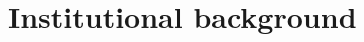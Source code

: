 \documentclass[../main.tex]{subfiles}
\begin{document}
\section{Institutional background}
\label{sec:institutional_background}

\end{document}
